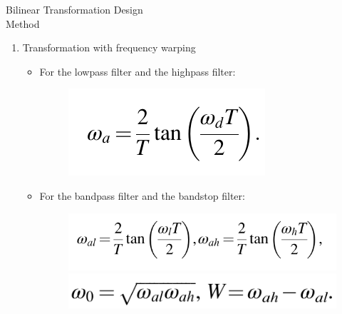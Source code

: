 \documentclass[pdflatex,compress,mathserif]{beamer}
\begin{document}
\begin{frame}{Bilinear Transformation Design\\Method}
    \begin{enumerate}
        \item Transformation with frequency warping
        \begin{itemize}
            \item For the lowpass filter and the highpass filter:
            \begin{figure}
                \centering
                \includegraphics[width=0.4\linewidth]{./img/img04.png}
            \end{figure}
            \item For the bandpass filter and the bandstop filter:
            \begin{figure}
                \centering
                \includegraphics[width=0.7\linewidth]{./img/img05.png}
                \includegraphics[width=0.6\linewidth]{./img/img06.png}
            \end{figure}
        \end{itemize}
    \end{enumerate}
\end{frame}
\end{document}
